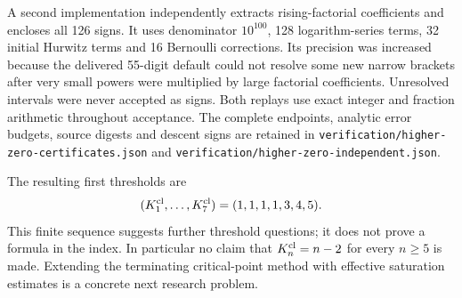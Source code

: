A second implementation independently extracts rising-factorial coefficients
and encloses all 126 signs. It uses denominator $10^{100}$, 128
logarithm-series terms, 32 initial Hurwitz terms and 16 Bernoulli corrections.
Its precision was increased because the delivered 55-digit default could
not resolve some new narrow brackets after very small powers were multiplied
by large factorial coefficients. Unresolved intervals were never accepted
as signs. Both replays use exact integer and fraction arithmetic throughout
acceptance. The complete endpoints, analytic error budgets, source digests
and descent signs are retained in
\texttt{verification/higher-zero-certificates.json} and
\texttt{verification/higher-zero-independent.json}.

The resulting first thresholds are
\[
 (K_1^{\rm cl},\ldots,K_7^{\rm cl})=(1,1,1,1,3,4,5).
\]
This finite sequence suggests further threshold questions; it does not
prove a formula in the index. In particular no claim that $K_n^{\rm cl}=n-2$
for every $n\ge5$ is made. Extending the terminating critical-point method
with effective saturation estimates is a concrete next research problem.
